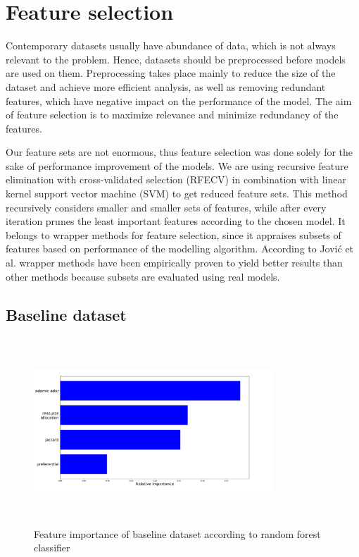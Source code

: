 \documentclass[9pt,twocolumn,twoside]{pnas-new}
\begin{document}
\section*{Feature selection}

Contemporary datasets usually have abundance of data, which is not always relevant to the problem. Hence, datasets should be preprocessed before models are used on them. Preprocessing takes place mainly to reduce the size of the dataset and achieve more efficient analysis, as well as removing redundant features, which have negative impact on the performance of the model. The aim of feature selection is to maximize relevance and minimize redundancy of the features. 

Our feature sets are not enormous, thus feature selection was done solely for the sake of performance improvement of the models. We are using recursive feature elimination with cross-validated selection (RFECV) in combination with linear kernel support vector machine (SVM) to get reduced feature sets. This method recursively considers smaller and smaller sets of features, while after every iteration prunes the least important features according to the chosen model. It belongs to wrapper methods for feature selection, since it appraises subsets of features based on performance of the modelling algorithm. According to Jović et al. \cite{Jovic2015} wrapper methods have been empirically proven to yield better results than other methods because subsets are evaluated using real models. 





\subsection*{Baseline dataset}


\begin{figure}
\centering
\includegraphics[width=9cm, height=7cm]{baseline_feature_importance.png}
\caption{Feature importance of baseline dataset according to random forest classifier}
\label{fig:baseline_feature_importance}
\end{figure}
\end{document}
